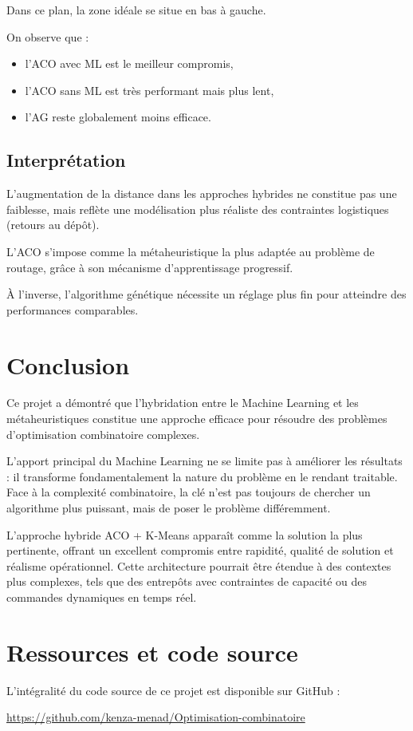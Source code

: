 \documentclass[a4paper, 12pt, twoside]{report}
\begin{document}
Dans ce plan, la zone idéale se situe en bas à gauche.

On observe que :
\begin{itemize}
    \item l’ACO avec ML est le meilleur compromis,
    \item l’ACO sans ML est très performant mais plus lent,
    \item l’AG reste globalement moins efficace.
\end{itemize}

\section{Interprétation}

L’augmentation de la distance dans les approches hybrides ne constitue pas une faiblesse, mais reflète une modélisation plus réaliste des contraintes logistiques (retours au dépôt).

L’ACO s’impose comme la métaheuristique la plus adaptée au problème de routage, grâce à son mécanisme d’apprentissage progressif.

À l’inverse, l’algorithme génétique nécessite un réglage plus fin pour atteindre des performances comparables.


\chapter{Conclusion}

Ce projet a démontré que l'hybridation entre le Machine Learning
et les métaheuristiques constitue une approche efficace pour
résoudre des problèmes d'optimisation combinatoire complexes.

L'apport principal du Machine Learning ne se limite pas à améliorer
les résultats : il transforme fondamentalement la nature du problème
en le rendant traitable. Face à la complexité combinatoire, la clé
n'est pas toujours de chercher un algorithme plus puissant, mais
de poser le problème différemment.

L'approche hybride ACO + K-Means apparaît comme la solution la plus
pertinente, offrant un excellent compromis entre rapidité, qualité
de solution et réalisme opérationnel. Cette architecture pourrait
être étendue à des contextes plus complexes, tels que des entrepôts
avec contraintes de capacité ou des commandes dynamiques en temps réel.


\chapter{Ressources et code source}
L'intégralité du code source de ce projet est disponible sur GitHub :
\begin{center}
    \url{https://github.com/kenza-menad/Optimisation-combinatoire}
\end{center}
\end{document}

